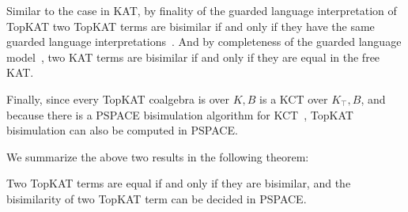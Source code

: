 Similar to the case in KAT, by finality of the guarded language interpretation of TopKAT
two TopKAT terms are bisimilar if and only if they have 
the same guarded language interpretations~\cite[Theorem 2.2.6, Theorem 2.2.7]{Silva_2010}.
And by completeness of the guarded language model~\cite{Kozen_Smith_1997},
two KAT terms are bisimilar if and only if they are equal in the free KAT.

Finally, since every TopKAT coalgebra is over \(K, B\) is a KCT over \(K_⊤, B\),
and because there is a PSPACE bisimulation algorithm for KCT~\cite[Section 6]{Kozen_2008},
TopKAT bisimulation can also be computed in PSPACE.

We summarize the above two results in the following theorem:
\begin{theorem}
    Two TopKAT terms are equal if and only if they are bisimilar,
    and the bisimilarity of two TopKAT term can be decided in PSPACE.
\end{theorem}